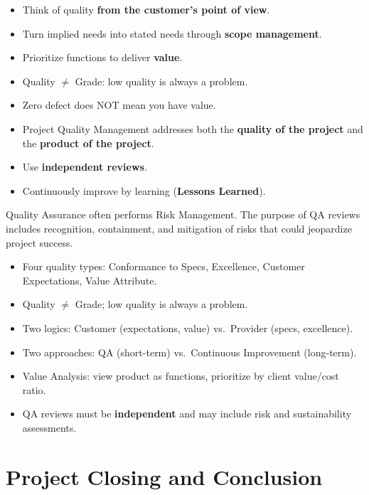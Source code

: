 \documentclass[11pt,a4paper]{article}
\theoremstyle{definition}
\theoremstyle{plain}
\begin{document}
\begin{itemize}[nosep]
  \item Think of quality \textbf{from the customer's point of view}.
  \item Turn implied needs into stated needs through \textbf{scope management}.
  \item Prioritize functions to deliver \textbf{value}.
  \item Quality $\neq$ Grade: low quality is always a problem.
  \item Zero defect does NOT mean you have value.
  \item Project Quality Management addresses both the \textbf{quality of the project} and the \textbf{product of the project}.
  \item Use \textbf{independent reviews}.
  \item Continuously improve by learning (\textbf{Lessons Learned}).
\end{itemize}

\begin{remark}
Quality Assurance often performs Risk Management. The purpose of QA reviews includes recognition, containment, and mitigation of risks that could jeopardize project success.
\end{remark}

\begin{keytakeaways}
\begin{itemize}[nosep]
  \item Four quality types: Conformance to Specs, Excellence, Customer Expectations, Value Attribute.
  \item Quality $\neq$ Grade; low quality is always a problem.
  \item Two logics: Customer (expectations, value) vs.\ Provider (specs, excellence).
  \item Two approaches: QA (short-term) vs.\ Continuous Improvement (long-term).
  \item Value Analysis: view product as functions, prioritize by client value/cost ratio.
  \item QA reviews must be \textbf{independent} and may include risk and sustainability assessments.
\end{itemize}
\end{keytakeaways}


\section{Project Closing and Conclusion}
\end{document}
